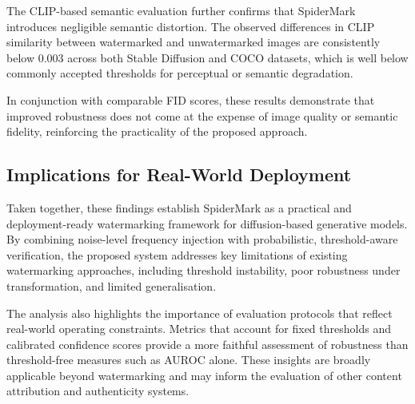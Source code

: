The CLIP-based semantic evaluation further confirms that SpiderMark introduces negligible semantic distortion. The observed differences in CLIP similarity between watermarked and unwatermarked images are consistently below 0.003 across both Stable Diffusion and COCO datasets, which is well below commonly accepted thresholds for perceptual or semantic degradation.

In conjunction with comparable FID scores, these results demonstrate that improved robustness does not come at the expense of image quality or semantic fidelity, reinforcing the practicality of the proposed approach.

\subsection{Implications for Real-World Deployment}

Taken together, these findings establish SpiderMark as a practical and deployment-ready watermarking framework for diffusion-based generative models. By combining noise-level frequency injection with probabilistic, threshold-aware verification, the proposed system addresses key limitations of existing watermarking approaches, including threshold instability, poor robustness under transformation, and limited generalisation.

The analysis also highlights the importance of evaluation protocols that reflect real-world operating constraints. Metrics that account for fixed thresholds and calibrated confidence scores provide a more faithful assessment of robustness than threshold-free measures such as AUROC alone. These insights are broadly applicable beyond watermarking and may inform the evaluation of other content attribution and authenticity systems.
